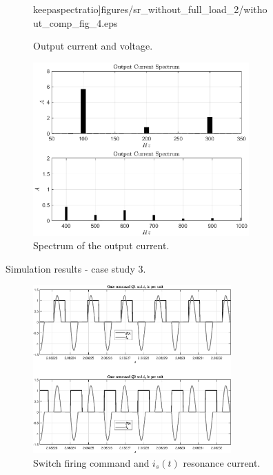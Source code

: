 \documentclass[11pt,a4paper,oneside]{book}
\numberwithin{equation}{section}
\theoremstyle{it}
\theoremstyle{definition}
\begin{document}
\begin{onehalfspace}
\begin{figure}[H]
\begin{subfigure}{0.5\textwidth}
		keepaspectratio]{figures/sr_without_full_load_2/without_comp_fig_4.eps}
		\captionsetup{width=0.65\textwidth, font=footnotesize}	
		\caption{Output current and voltage.}
		\label{}
	\end{subfigure}%
	\begin{subfigure}{0.5\textwidth}
		\centering
		\includegraphics[width = 235pt, angle = 0, 
		keepaspectratio]{figures/sr_without_full_load_2/output_current_spectrum.eps}
		\captionsetup{width=0.65\textwidth, font=footnotesize}	
		\caption{Spectrum of the output current.}
		\label{}
	\end{subfigure}
	\captionsetup{width=0.5\textwidth, font=small}	
	\caption{Simulation results - case study 3.}
	\label{}
\end{figure}
\begin{figure}[H]
	\centering
	\begin{subfigure}{0.5\textwidth}
		\centering
		\includegraphics[width = 215pt, angle = 0, 
		keepaspectratio]{figures/sr_without_full_load_2/without_comp_fig_1.eps}
		\captionsetup{width=0.65\textwidth, font=footnotesize}	
		\caption{Switch firing command and $i_s(t)$ resonance current.}
		\label{}
	\end{subfigure}%
	\begin{subfigure}{0.5\textwidth}
		\centering

\end{subfigure}
\end{figure}
\end{onehalfspace}
\end{document}
